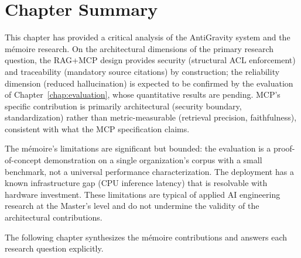 \section{Chapter Summary}
\label{sec:disc-summary}

This chapter has provided a critical analysis of the AntiGravity system and the mémoire research. On the architectural dimensions of the primary research question, the RAG+MCP design provides security (structural ACL enforcement) and traceability (mandatory source citations) by construction; the reliability dimension (reduced hallucination) is expected to be confirmed by the evaluation of Chapter~\ref{chap:evaluation}, whose quantitative results are pending. MCP's specific contribution is primarily architectural (security boundary, standardization) rather than metric-measurable (retrieval precision, faithfulness), consistent with what the MCP specification claims.

The mémoire's limitations are significant but bounded: the evaluation is a proof-of-concept demonstration on a single organization's corpus with a small benchmark, not a universal performance characterization. The deployment has a known infrastructure gap (CPU inference latency) that is resolvable with hardware investment. These limitations are typical of applied AI engineering research at the Master's level and do not undermine the validity of the architectural contributions.

The following chapter synthesizes the mémoire contributions and answers each research question explicitly.
